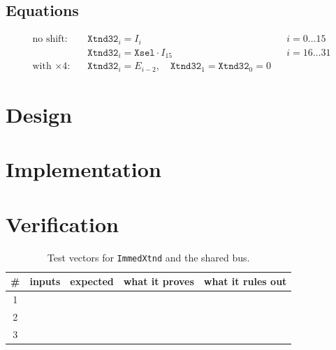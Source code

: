 \subsection*{Equations}

\begin{align*}
\text{no shift:} \quad & \texttt{Xtnd32}_i = I_i && i = 0\ldots15 \\
                       & \texttt{Xtnd32}_i = \texttt{Xsel}\cdot I_{15} && i = 16\ldots31 \\
\text{with $\times4$:} \quad & \texttt{Xtnd32}_i = E_{i-2}, \quad \texttt{Xtnd32}_1 = \texttt{Xtnd32}_0 = 0
\end{align*}


\section{Design}

\section{Implementation}



\section{Verification}

\begin{table}[htbp]
\centering
\caption{Test vectors for \texttt{ImmedXtnd} and the shared bus.}
\label{tab:lab04-vectors}
\begin{tabular}{cllll}
\toprule
\# & inputs & expected & what it proves & what it rules out \\
\midrule
1 & & & & \\
2 & & & & \\
3 & & & & \\
\bottomrule
\end{tabular}
\end{table}

